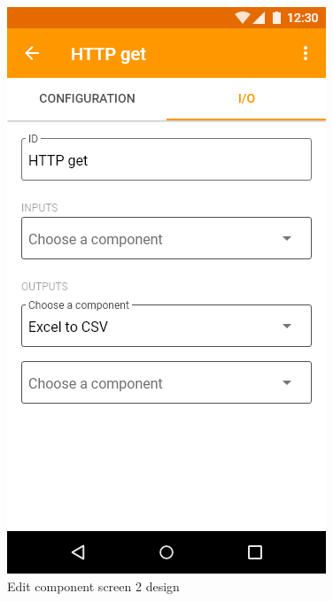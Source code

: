 \begin{figure}
\begin{minipage}[b]{0.32\textwidth}
    	\includegraphics[width=\textwidth]{pics/xd/Edit component - io.png}
    	\caption[Edit component screen 2]{Edit component screen 2 design}\label{fig:xdEditComponent2}
    \end{minipage}
\end{figure}


